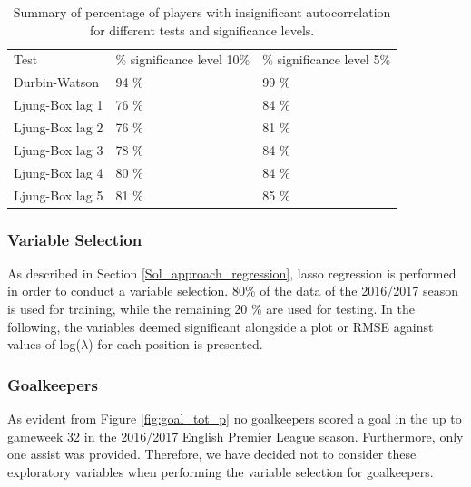\begin{table}[H]
\centering
\begin{tabular}{lll}
Test            & \% significance level 10\% & \% significance level 5\% \\
Durbin-Watson   & 94 \% & 99 \%                                            \\
Ljung-Box lag 1 & 76 \% & 84 \%                                            \\
Ljung-Box lag 2 & 76 \% & 81 \%                                            \\
Ljung-Box lag 3 & 78 \% & 84 \%                                            \\
Ljung-Box lag 4 & 80 \% & 84 \%                                           \\
Ljung-Box lag 5 & 81 \% & 85 \%                                          
\end{tabular}
\caption{Summary of percentage of players with insignificant autocorrelation for different tests and significance levels.}
\label{tab:auto_tests}
\end{table}

\subsubsection{Variable Selection}

As described in Section \ref{Sol_approach_regression}, lasso regression is performed in order to conduct a variable selection. 80\% of the data of the 2016/2017 season is used for training, while the remaining 20 \% are used for testing. In the following, the variables deemed significant alongside a plot or RMSE against values of log($\lambda$) for each position is presented.

\newpar

\subsubsection{Goalkeepers}
As evident from Figure \ref{fig:goal_tot_p} no goalkeepers scored a goal in the up to gameweek 32 in the 2016/2017 English Premier League season. Furthermore, only one assist was provided. Therefore, we have decided not to consider these exploratory variables when performing the variable selection for goalkeepers. 

